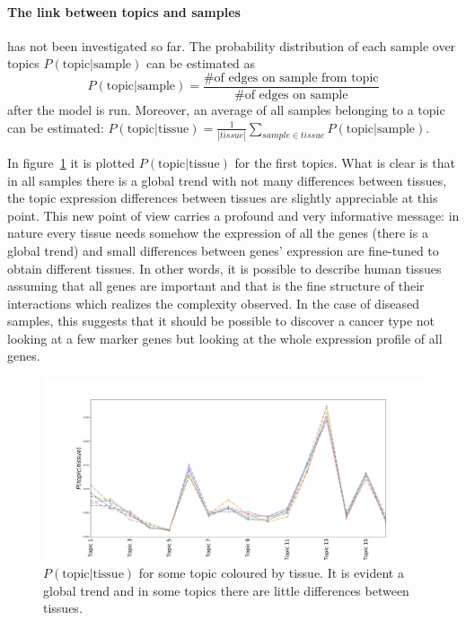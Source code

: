 \FloatBarrier
\paragraph{The link between topics and samples} has not been investigated so far. The probability distribution of each sample over topics $P(\text{topic}| \text{sample})$ can be estimated as \[P(\text{topic}| \text{sample})=\frac{\text{\# of edges on sample from topic}}{\text{\# of edges on sample}}\] after the model is run. Moreover, an average of all samples belonging to a topic can be estimated: $P(\text{topic}| \text{tissue})=\frac{1}{\left|tissue\right|}\sum_{sample\in tissue}P(\text{topic}| \text{sample})$.

In figure~\ref{fig:topic/merged/lifeplot} it is plotted $P(\text{topic}| \text{tissue})$ for the first topics. What is clear is that in all samples there is a global trend with not many differences between tissues, the topic expression differences between tissues are slightly appreciable at this point. This new point of view carries a profound and very informative message: in nature every tissue needs somehow the expression of all the genes (there is a global trend) and small differences between genes' expression are fine-tuned to obtain different tissues. In other words, it is possible to describe human tissues assuming that all genes are important and that is the fine structure of their interactions which realizes the complexity observed. In the case of diseased samples, this suggests that it should be possible to discover a cancer type not looking at a few marker genes but looking at the whole expression profile of all genes.
\begin{figure}[htb!]
	\centering
	\includegraphics[width=0.9\linewidth]{pictures/topic/merged/lifeplot.pdf}
	\caption{$P(\text{topic} | \text{tissue})$ for some topic coloured by tissue. It is evident a global trend and in some topics there are little differences between tissues.}
	\label{fig:topic/merged/lifeplot}
\end{figure}

